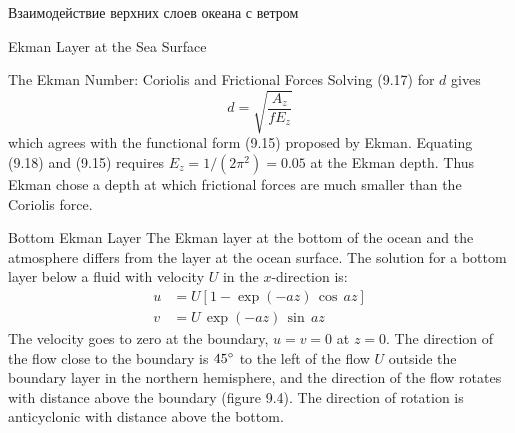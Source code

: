 \begin{chapter}{Взаимодействие верхних слоев океана с ветром}
\begin{section}{Ekman Layer at the Sea Surface}
\begin{paragraph}{The Ekman Number: Coriolis and Frictional Forces}
Solving (9.17) for $d$ gives
\begin{equation}
 d = \sqrt{\frac{A_z}{fE_z}}
\end{equation}
which agrees with the functional form (9.15) proposed by
Ekman. Equating (9.18) and (9.15) requires $E_z = 1/(2\pi^2) = 0.05$
at the Ekman depth. Thus Ekman chose a depth at which frictional
forces are much smaller than the Coriolis force.
%
\end{paragraph}

\begin{paragraph}{Bottom Ekman Layer}
The Ekman layer at the bottom of the ocean
and the atmosphere differs from the layer at the ocean surface. The
solution for a bottom layer below a fluid with velocity $U$ in the
$x$-direction is:
\begin{subequations}
\begin{align}
u&=U[1 - \exp(-az)\,\cos\,az]  \\
v&=U\,\exp(-az)\,\sin\,az
\end{align}
\end{subequations}
The velocity goes to zero at the boundary, $u = v = 0$ at $z = 0$. The
direction of the flow close to the boundary is ${45}^\circ$ to the left
of the flow $U$ outside the boundary layer in the northern hemisphere,
and the direction of the flow rotates with distance above the boundary
(figure 9.4). The direction of rotation is anti\-cyclonic with
distance above the bottom.
%


\end{paragraph}
\end{section}
\end{chapter}

